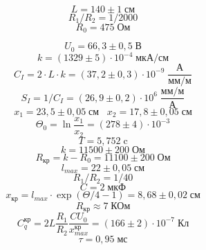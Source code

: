 \begin{figure}[ht!]
\end{figure}

\[
    L = 140\pm 1\;\text{см}
\]
\[
    R_{1}/R_{2} = 1/2000
\]
\[
    R_{0} = 475\;\text{Ом}
\]

\[
    U_{0} = 66{,}3\pm 0{,}5\;\text{В}
\]
\[
    k = \left(1329 \pm 5\right)\cdot 10^{-4}\;\text{мкА} / \text{см}
\]
\[
    C_{I} = 2\cdot L\cdot k = \left(37{,}2 \pm 0{,}3\right)\cdot 10^{-9}\;\frac{\text{А}}{\text{мм}/\text{м}}
\]
\[
    S_{I} = 1/C_{I} = \left(26{,}9 \pm 0{,}2\right)\cdot 10^{6}\;\frac{\text{мм}/\text{м}}{\text{А}}
\]
\[
    x_{1} = 23{,}5\pm 0{,}05\;\text{см}\;\;\; x_{2} = 17{,}8\pm 0{,}05\;\text{см}
\]
\[
    \Theta_{0} = \ln\frac{x_{1}}{x_{2}} = \left(278 \pm 4\right)\cdot 10^{-3}
\]
\[
    T = 5{,}752\;\text{c}
\]
\[
    k = 11500 \pm 200\;\text{Ом}
\]
\[
    R_{\text{кр}} = k - R_{0} = 11100 \pm 200\;\text{Ом}
\]
\[
    l_{max} = 22\pm 0{,}05\;\text{см}
\]
\[
    R_{1}/R_{2} = 1/40
\]
\[
    C = 2\;\text{мкФ}
\]
\[
    x_{\text{кр}} = l_{max}\cdot \exp\left( \Theta / 4 - 1\right) = 8{,}68 \pm 0{,}02\;\text{см}
\]
\[
    R_{\text{кр}} \approx 7\;\text{КОм}
\]
\[
    C^{\text{кр}}_{q} = 2L\frac{R_{1}}{R_{2}}\frac{CU_{0}}{x_{max}^{\text{кр}}} = \left(166 \pm 2\right)\cdot 10^{-7}\;\text{Кл}    
\]
\[
    \tau = 0{,}95\;\text{мс}
\]

